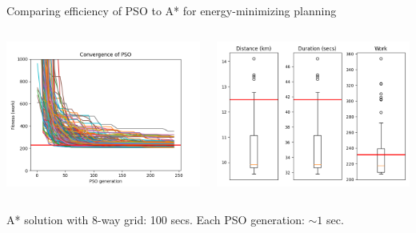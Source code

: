 \documentclass[9pt,xcolor=table]{beamer}
\begin{document}
\begin{frame}{Comparing efficiency of PSO to A* for energy-minimizing planning}
\begin{columns}
        \begin{column}{0.5\textwidth}
            \includegraphics[width=\textwidth,trim={0cm 0cm 0cm 0cm},clip]{img/FP1_convergence.png}
        \end{column}
        \begin{column}{0.5\textwidth}
            \includegraphics[width=\textwidth,trim={0cm 0cm 0cm 0cm},clip]{img/FP1_box.png}
        \end{column}
    \end{columns}
        {\tiny A* solution with 8-way grid: 100 secs. Each PSO generation: $\sim 1$ sec.}
\end{frame}
\end{document}
